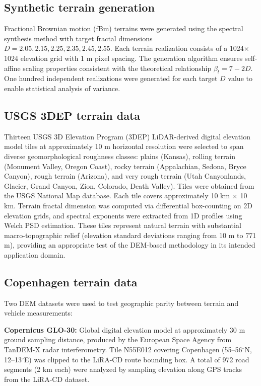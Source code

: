 \documentclass[11pt]{article}
\begin{document}
\subsection*{Synthetic terrain generation}

Fractional Brownian motion (fBm) terrains were generated using the spectral synthesis method\cite{Musgrave2000} with target fractal dimensions $D = 2.05, 2.15, 2.25, 2.35, 2.45, 2.55$. Each terrain realization consists of a 1024$\times$1024 elevation grid with 1 m pixel spacing. The generation algorithm ensures self-affine scaling properties consistent with the theoretical relationship $\beta_t = 7-2D$. One hundred independent realizations were generated for each target $D$ value to enable statistical analysis of variance.

\subsection*{USGS 3DEP terrain data}

Thirteen USGS 3D Elevation Program (3DEP) LiDAR-derived digital elevation model tiles at approximately 10 m horizontal resolution were selected to span diverse geomorphological roughness classes: plains (Kansas), rolling terrain (Monument Valley, Oregon Coast), rocky terrain (Appalachian, Sedona, Bryce Canyon), rough terrain (Arizona), and very rough terrain (Utah Canyonlands, Glacier, Grand Canyon, Zion, Colorado, Death Valley). Tiles were obtained from the USGS National Map database. Each tile covers approximately 10 km $\times$ 10 km. Terrain fractal dimension was computed via differential box-counting on 2D elevation grids, and spectral exponents were extracted from 1D profiles using Welch PSD estimation. These tiles represent natural terrain with substantial macro-topographic relief (elevation standard deviations ranging from 10 m to 771 m), providing an appropriate test of the DEM-based methodology in its intended application domain.

\subsection*{Copenhagen terrain data}

Two DEM datasets were used to test geographic parity between terrain and vehicle measurements:

\textbf{Copernicus GLO-30:} Global digital elevation model at approximately 30 m ground sampling distance, produced by the European Space Agency from TanDEM-X radar interferometry. Tile N55E012 covering Copenhagen (55--56$^\circ$N, 12--13$^\circ$E) was clipped to the LiRA-CD route bounding box. A total of 972 road segments (2 km each) were analyzed by sampling elevation along GPS tracks from the LiRA-CD dataset.
\end{document}
